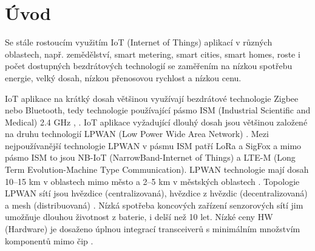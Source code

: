\chapter{Úvod}
Se stále rostoucím využitím IoT (Internet of Things) aplikací v různých oblastech, např. zemědělství, smart metering, smart cities, smart homes, roste i počet dostupných bezdrátových technologií se zaměřením na 
nízkou spotřebu energie, velký dosah, nízkou přenosovou rychlost a nízkou cenu.

IoT aplikace na krátký dosah %
většinou využívají bezdrátové technologie Zigbee nebo Bluetooth, tedy technologie používající pásmo ISM (Industrial Scientific and Medical) 2.4 GHz \cite{Design and Implementation of an IoT Assisted Real Time ZigBee Mesh WSN}, \cite{Internet of Things (IoT) for building Smart Home System}.
IoT aplikace vyžadující dlouhý dosah jsou většinou založené na druhu technologií LPWAN (Low Power Wide Area Network) \cite{A comparative study of LPWAN technologies for large-scale IoTdeployment}. 
Mezi nejpoužívanější technologie LPWAN v pásmu ISM patří LoRa a SigFox a mimo pásmo ISM to jsou NB-IoT (NarrowBand-Internet of Things) a LTE-M (Long Term Evolution-Machine Type Communication).
LPWAN technologie mají dosah 10–15 km v oblastech mimo město a 2–5 km v městských oblastech \cite{Long-Range Communications in Unlicensed Bands}. Topologie LPWAN sítí jsou hvězdice (centralizovaná), hvězdice z hvězdic (decentralizovaná) a mesh (distribuovaná) \cite{high density LPWAN}.
Nízká spotřeba koncových zařízení senzorových sítí jim umožňuje dlouhou životnost z baterie, i delší než 10 let.
Nízké ceny HW (Hardware) je dosaženo úplnou integrací transceiverů s minimálním množstvím komponentů mimo čip \cite{MURS Band for LPWAN Applications}. 



